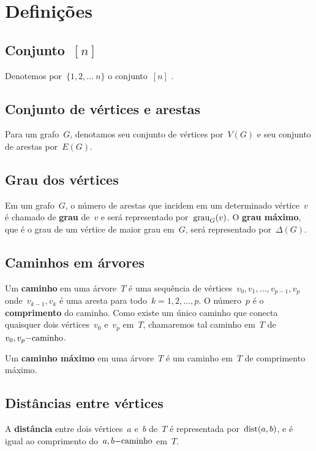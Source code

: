 \section{Definições}
	
	\subsection*{Conjunto~$[n]$}
	Denotemos por~$\{1,2,\ldots~n\}$
	o conjunto~$[n]$ .

	\subsection*{Conjunto de vértices e arestas}
	Para um grafo~$G$, denotamos seu
	conjunto de vértices por~$V(G)$ e seu
	conjunto de arestas por~$E(G)$.

	\subsection*{Grau dos vértices}
	Em um grafo~$G$, o número de arestas que incidem em um 
	determinado vértice~$v$ é chamado de 
	\textbf{grau} de~$v$ e será representado
	por~$\mathrm{grau}_G(v)$. O 
	\textbf{grau máximo}, que é o grau de um vértice de
	maior grau em~$G$, será representado por~$\Delta(G)$.

	\subsection*{Caminhos em árvores}
	Um \textbf{caminho} em uma árvore~$T$ é uma sequência de 
	vértices~$v_0, v_1, \ldots,v_{p-1}, v_p$ 
	onde~$v_{k-1}, v_k$ é uma aresta para 
	todo~${k =1,2, \ldots, p}$. 
	O número~$p$ é o \textbf{comprimento} do caminho.
	Como existe um único caminho que conecta quaisquer dois 
	vértices~$v_0$ e~$v_p$ em~$T$, chamaremos tal caminho em~$T$ 
	de~$v_0,v_p\mathrm{-caminho}$.

	Um \textbf{caminho máximo} em uma árvore~$T$ é um caminho 
	em~$T$ de comprimento máximo.

	\subsection*{Distâncias entre vértices}
	A \textbf{distância} entre dois vértices~$a$ e~$b$ de~$T$ é 
	representada por~$\mathrm{dist}(a,b)$, e é igual ao comprimento 
	do~$a,b\mathrm{-caminho}$ em~$T$.
